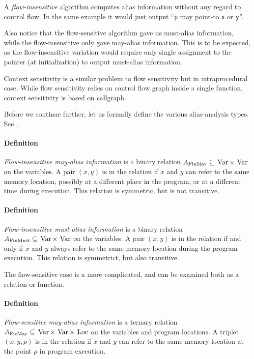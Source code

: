 A {\it flow-insensitive} algorithm computes alias information without any regard
to control flow. In the same example it would just output ``{\tt p} may point-to
{\tt x} or {\tt y}''.

Also notice that the flow-sensitive algorithm gave us must-alias
information, while the flow-insensitive only gave may-alias information.
This is to be expected, as the flow-insensitive variation would require only
single assignment to the pointer (at initialization) to output must-alias
information.

Context sensitivity is a similar problem to flow sensitivity but in
intraprocedural case. While flow sensitivity relies on control flow graph inside
a single function, context sensitivity is based on callgraph. 

Before we continue further, let us formally define the various alias-analysis
types. See \cite{muchnick1997advanced}.

\paragraph{Definition} {\it Flow-insensitive may-alias information} is a binary
relation $A_{\mathrm{FinMay}} \subseteq \operatorname*{\,Var} \times \operatorname*{\,Var} $ on the variables. A pair
$(x,y)$ is in the relation if $x$ and $y$ can refer to the same
memory location, possibly at a different place in the program, or at a different
time during execution. This relation is symmetric, but is not transitive.

\paragraph{Definition} {\it Flow-insensitive must-alias information} is a binary
relation $A_{\mathrm{FinMust}} \subseteq \operatorname*{\,Var} \times \operatorname*{\,Var}$ on the variables. A pair
$(x,y)$ is in the relation if and only if $x$ and $y$ always refer to the same
memory location during the program execution. This relation is symmetrict, but
also transitive. 

The flow-sensitive case is a more complicated, and can be examined both as a
relation or function.

\paragraph{Definition} {\it Flow-sensitive may-alias information} is a ternary
relation $A_{\mathrm{FseMay}} \subseteq \operatorname*{\,Var} \times \operatorname*{\,Var} \times \operatorname*{\,Loc}$ on the variables
and program locations. A triplet $(x,y,p)$ is in the relation if $x$
and $y$ can refer to the same memory location at the point $p$ in program
execution.

